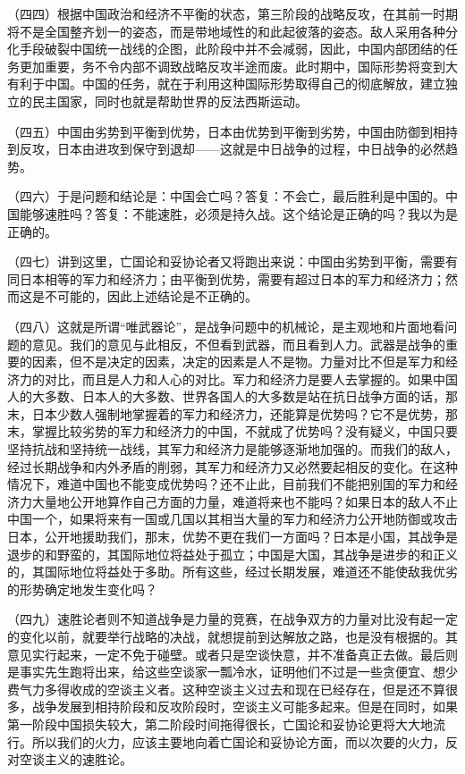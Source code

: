 \documentclass[UTF8, 12pt, a4paper]{ctexrep}
\begin{document}
（四四）根据中国政治和经济不平衡的状态，第三阶段的战略反攻，在其前一时期将不是全国整齐划一的姿态，而是带地域性的和此起彼落的姿态。敌人采用各种分化手段破裂中国统一战线的企图，此阶段中并不会减弱，因此，中国内部团结的任务更加重要，务不令内部不调致战略反攻半途而废。此时期中，国际形势将变到大有利于中国。中国的任务，就在于利用这种国际形势取得自己的彻底解放，建立独立的民主国家，同时也就是帮助世界的反法西斯运动。

（四五）中国由劣势到平衡到优势，日本由优势到平衡到劣势，中国由防御到相持到反攻，日本由进攻到保守到退却——这就是中日战争的过程，中日战争的必然趋势。

（四六）于是问题和结论是：中国会亡吗？答复：不会亡，最后胜利是中国的。中国能够速胜吗？答复：不能速胜，必须是持久战。这个结论是正确的吗？我以为是正确的。

（四七）讲到这里，亡国论和妥协论者又将跑出来说：中国由劣势到平衡，需要有同日本相等的军力和经济力；由平衡到优势，需要有超过日本的军力和经济力；然而这是不可能的，因此上述结论是不正确的。

（四八）这就是所谓“唯武器论”，是战争问题中的机械论，是主观地和片面地看问题的意见。我们的意见与此相反，不但看到武器，而且看到人力。武器是战争的重要的因素，但不是决定的因素，决定的因素是人不是物。力量对比不但是军力和经济力的对比，而且是人力和人心的对比。军力和经济力是要人去掌握的。如果中国人的大多数、日本人的大多数、世界各国人的大多数是站在抗日战争方面的话，那末，日本少数人强制地掌握着的军力和经济力，还能算是优势吗？它不是优势，那末，掌握比较劣势的军力和经济力的中国，不就成了优势吗？没有疑义，中国只要坚持抗战和坚持统一战线，其军力和经济力是能够逐渐地加强的。而我们的敌人，经过长期战争和内外矛盾的削弱，其军力和经济力又必然要起相反的变化。在这种情况下，难道中国也不能变成优势吗？还不止此，目前我们不能把别国的军力和经济力大量地公开地算作自己方面的力量，难道将来也不能吗？如果日本的敌人不止中国一个，如果将来有一国或几国以其相当大量的军力和经济力公开地防御或攻击日本，公开地援助我们，那末，优势不更在我们一方面吗？日本是小国，其战争是退步的和野蛮的，其国际地位将益处于孤立；中国是大国，其战争是进步的和正义的，其国际地位将益处于多助。所有这些，经过长期发展，难道还不能使敌我优劣的形势确定地发生变化吗？

（四九）速胜论者则不知道战争是力量的竞赛，在战争双方的力量对比没有起一定的变化以前，就要举行战略的决战，就想提前到达解放之路，也是没有根据的。其意见实行起来，一定不免于碰壁。或者只是空谈快意，并不准备真正去做。最后则是事实先生跑将出来，给这些空谈家一瓢冷水，证明他们不过是一些贪便宜、想少费气力多得收成的空谈主义者。这种空谈主义过去和现在已经存在，但是还不算很多，战争发展到相持阶段和反攻阶段时，空谈主义可能多起来。但是在同时，如果第一阶段中国损失较大，第二阶段时间拖得很长，亡国论和妥协论更将大大地流行。所以我们的火力，应该主要地向着亡国论和妥协论方面，而以次要的火力，反对空谈主义的速胜论。
\end{document}

